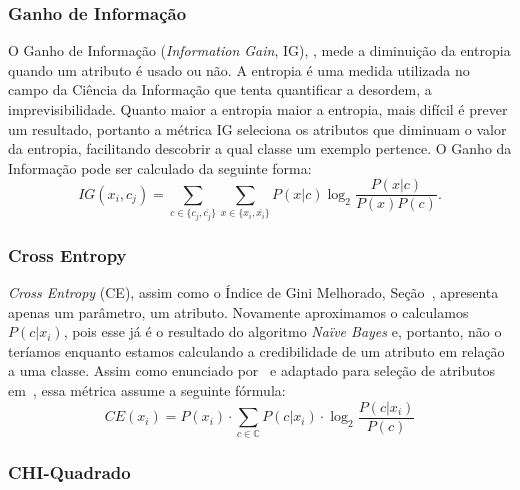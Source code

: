 \subsubsection{Ganho de Informação}
\label{subsubsection::ig}

O Ganho de Informação (\textit{Information Gain}, IG), \cite{Yang97}, mede a diminuição da entropia quando um atributo é usado ou não. A entropia é uma medida utilizada no campo da Ciência da Informação que tenta quantificar a desordem, a imprevisibilidade. Quanto maior a entropia maior a entropia, mais difícil é prever um resultado, portanto a métrica IG seleciona os atributos que diminuam o valor da entropia, facilitando descobrir a qual classe um exemplo pertence. O Ganho da Informação pode ser calculado da seguinte forma:
\begin{equation}\label{eqn::ig}
   IG(x_i, c_j) = \sum_{c \in \{c_j, \overline{c_j}\}}\sum_{x \in \{x_i, \overline{x_i}\}}P(x|c)\log_2\frac{P(x|c)}{P(x)P(c)}.
\end{equation}

\subsubsection{Cross Entropy}
\label{subsubsection::}

\textit{Cross Entropy} (CE), assim como o Índice de Gini Melhorado, Seção~\cite{subsubsection::gini}, apresenta apenas um parâmetro, um atributo. Novamente aproximamos o calculamos $P(c|x_i)$, pois esse já é o resultado do algoritmo \textit{Naïve Bayes} e, portanto, não o teríamos enquanto estamos calculando a credibilidade de um atributo em relação a uma classe. Assim como enunciado por~\cite{Koller97} e adaptado para seleção de atributos em~\cite{Mladenic98}, essa métrica assume a seguinte fórmula:
\begin{equation}\label{eqn::ce}
   CE(x_i) =  P(x_i) \cdot \sum_{c \in \mathbb{C}} P(c|x_i) \cdot \log_2 \frac{ P(c|x_i) } { P(c) }
\end{equation}

\subsubsection{CHI-Quadrado}
\label{subsubsection::chi}

